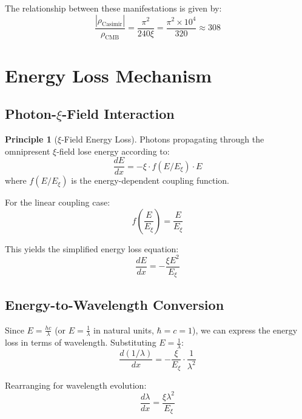 \documentclass[12pt,a4paper]{article}
\newcommand{\Exi}{E_\xi}
\newcommand{\xicoupling}{f(E/\Exi)}
\theoremstyle{definition}
\newtheorem{principle}{Principle}
\begin{document}
	The relationship between these manifestations is given by:
	\begin{equation}
		\frac{|\rho_{\text{Casimir}}|}{\rho_{\text{CMB}}} = \frac{\pi^2}{240 \xi} = \frac{\pi^2 \times 10^4}{320} \approx 308
	\end{equation}
	
	\section{Energy Loss Mechanism}
	
	\subsection{Photon-$\xi$-Field Interaction}
	
	\begin{principle}[$\xi$-Field Energy Loss]
		Photons propagating through the omnipresent $\xi$-field lose energy according to:
		\begin{equation}
			\frac{dE}{dx} = -\xi \cdot \xicoupling \cdot E
		\end{equation}
		where $\xicoupling$ is the energy-dependent coupling function.
	\end{principle}
	
	For the linear coupling case:
	\begin{equation}
		f\left(\frac{E}{\Exi}\right) = \frac{E}{\Exi}
	\end{equation}
	
	This yields the simplified energy loss equation:
	\begin{equation}
		\frac{dE}{dx} = -\frac{\xi E^2}{\Exi}
	\end{equation}
	
	\subsection{Energy-to-Wavelength Conversion}
	
	Since $E = \frac{hc}{\lambda}$ (or $E = \frac{1}{\lambda}$ in natural units, $\hbar = c = 1$), we can express the energy loss in terms of wavelength. Substituting $E = \frac{1}{\lambda}$:
	\begin{equation}
		\frac{d(1/\lambda)}{dx} = -\frac{\xi}{\Exi} \cdot \frac{1}{\lambda^2}
	\end{equation}
	
	Rearranging for wavelength evolution:
	\begin{equation}
		\frac{d\lambda}{dx} = \frac{\xi \lambda^2}{\Exi}
	\end{equation}
	
\end{document}
